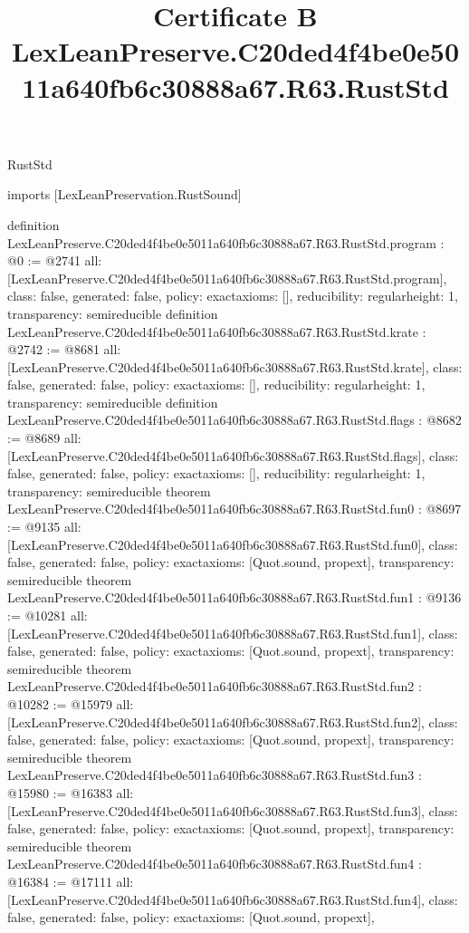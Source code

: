 \begin{lexlean}{RustStd}
\title{Certificate B LexLeanPreserve.C20ded4f4be0e5011a640fb6c30888a67.R63.RustStd}
\begin{coremodule}
imports [LexLeanPreservation.RustSound]

definition LexLeanPreserve.C20ded4f4be0e5011a640fb6c30888a67.R63.RustStd.program : @0 := @2741 {
  all: [LexLeanPreserve.C20ded4f4be0e5011a640fb6c30888a67.R63.RustStd.program],
  class: false,
  generated: false,
  policy: exact{axioms: []},
  reducibility: regular{height: 1},
  transparency: semireducible
}
definition LexLeanPreserve.C20ded4f4be0e5011a640fb6c30888a67.R63.RustStd.krate : @2742 := @8681 {
  all: [LexLeanPreserve.C20ded4f4be0e5011a640fb6c30888a67.R63.RustStd.krate],
  class: false,
  generated: false,
  policy: exact{axioms: []},
  reducibility: regular{height: 1},
  transparency: semireducible
}
definition LexLeanPreserve.C20ded4f4be0e5011a640fb6c30888a67.R63.RustStd.flags : @8682 := @8689 {
  all: [LexLeanPreserve.C20ded4f4be0e5011a640fb6c30888a67.R63.RustStd.flags],
  class: false,
  generated: false,
  policy: exact{axioms: []},
  reducibility: regular{height: 1},
  transparency: semireducible
}
theorem LexLeanPreserve.C20ded4f4be0e5011a640fb6c30888a67.R63.RustStd.fun0 : @8697 := @9135 {
  all: [LexLeanPreserve.C20ded4f4be0e5011a640fb6c30888a67.R63.RustStd.fun0],
  class: false,
  generated: false,
  policy: exact{axioms: [Quot.sound, propext]},
  transparency: semireducible
}
theorem LexLeanPreserve.C20ded4f4be0e5011a640fb6c30888a67.R63.RustStd.fun1 : @9136 := @10281 {
  all: [LexLeanPreserve.C20ded4f4be0e5011a640fb6c30888a67.R63.RustStd.fun1],
  class: false,
  generated: false,
  policy: exact{axioms: [Quot.sound, propext]},
  transparency: semireducible
}
theorem LexLeanPreserve.C20ded4f4be0e5011a640fb6c30888a67.R63.RustStd.fun2 : @10282 := @15979 {
  all: [LexLeanPreserve.C20ded4f4be0e5011a640fb6c30888a67.R63.RustStd.fun2],
  class: false,
  generated: false,
  policy: exact{axioms: [Quot.sound, propext]},
  transparency: semireducible
}
theorem LexLeanPreserve.C20ded4f4be0e5011a640fb6c30888a67.R63.RustStd.fun3 : @15980 := @16383 {
  all: [LexLeanPreserve.C20ded4f4be0e5011a640fb6c30888a67.R63.RustStd.fun3],
  class: false,
  generated: false,
  policy: exact{axioms: [Quot.sound, propext]},
  transparency: semireducible
}
theorem LexLeanPreserve.C20ded4f4be0e5011a640fb6c30888a67.R63.RustStd.fun4 : @16384 := @17111 {
  all: [LexLeanPreserve.C20ded4f4be0e5011a640fb6c30888a67.R63.RustStd.fun4],
  class: false,
  generated: false,
  policy: exact{axioms: [Quot.sound, propext]},
}
\end{coremodule}
\end{lexlean}
